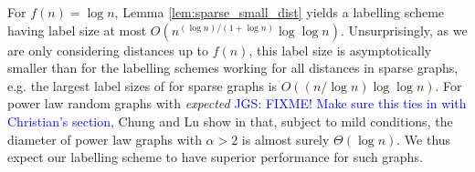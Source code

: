 For $f(n) = \log n$, Lemma \ref{lem:sparse_small_dist} yields a labelling scheme having label size
at most $O\left(n^{(\log n)/(1+ \log n)} \log\log n \right)$. Unsurprisingly, as we are only considering distances up
to $f(n)$, this label size is asymptotically smaller than for the labelling
schemes working for all distances in sparse graphs, e.g. the largest label sizes of \cite{DBLP:journals/corr/GawrychowskiKU15} for sparse graphs is $O((n/\log n) \log\log n)$.
For power law random graphs with \emph{expected} \textcolor{blue}{JGS: FIXME! Make sure this ties in with Christian's section}, Chung and Lu show in \cite{chung2004average} that, subject to mild conditions, the diameter of power law graphs with $\alpha > 2$ is almost surely $\Theta(\log n)$. We thus expect our labelling scheme to have
superior performance for such graphs.